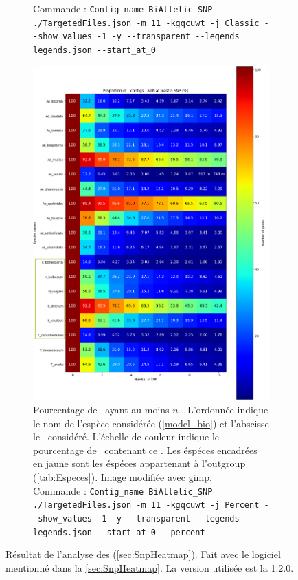 \documentclass[../main]{subfiles} %
\begin{document}
\begin{landscape}
\begin{figure}[p]
\begin{subfigure}[b]{0.55\paperwidth}
{        Commande : \lstinline{Contig_name BiAllelic_SNP ./TargetedFiles.json -m 11 -kgqcuwt -j Classic --show_values -1 -y --transparent --legends legends.json --start_at_0}  
        }
        \label{fig:ClassicSNPHeatmap}
    \end{subfigure}
    \hfill
    \begin{subfigure}[b]{0.55\paperwidth}
        \centering
        \includegraphics[width=\textwidth]{../Illustrations/Percent_Heatmap_SNP.png}
        \caption{Pourcentage de \contigs ayant au moins $n$ \SNP. L'ordonnée indique le nom de l'espèce considérée (\ref{model_bio}) et l'abscisse le \NbSNP considéré. L'échelle de couleur indique le pourcentage de \contigs contenant ce \NbSNP. Les éspéces encadrées en jaune sont les éspéces appartenant à l'\gls{outgroup} (\cref{tab:Especes}). Image modifiée avec \gls{gimp}.\\
        Commande : \lstinline{Contig_name BiAllelic_SNP ./TargetedFiles.json -m 11 -kgqcuwt -j Percent --show_values -1 -y --transparent --legends legends.json --start_at_0 --percent}
        }
        \label{fig:PercentSNPHeatmap}
    \end{subfigure}
    
    \caption{Résultat de l'analyse des \SNP (\ref{sec:SnpHeatmap}). Fait avec le logiciel mentionné dans la \ref{sec:SnpHeatmap}. La version utilisée est la 1.2.0.}
    \label{fig:SNPHeatmap}
    
\end{figure}
\end{landscape}
\restoregeometry
\end{document}
